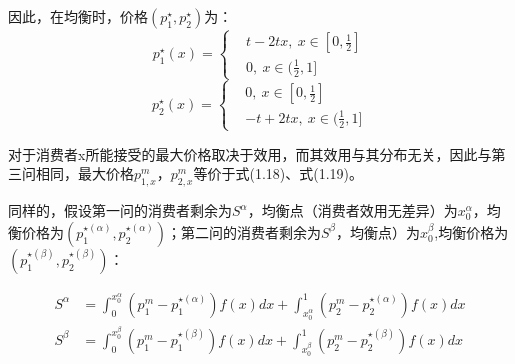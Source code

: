 因此，在均衡时，价格$(p_1^{\star},p_2^{\star})$为：
\begin{equation}
p_1^{\star}(x)=
    \begin{cases}
      &  t-2tx,  \ x \in [0,\frac{1}{2}] \\
     &0 ,\  x \in ( \frac{1}{2},1]
    \end{cases}
\end{equation}
\begin{equation}
p_2^{\star}(x)= 
    \begin{cases}
     & 0,  \ x \in [0,\frac{1}{2}] \\
     & -t+2tx ,\  x \in ( \frac{1}{2},1]
    \end{cases}
\end{equation}

\qsubpart
对于消费者x所能接受的最大价格取决于效用，而其效用与其分布无关，因此与第三问相同，最大价格$p^m_{1,x}$，$p^m_{2,x}$等价于式(1.18)、式(1.19)。

同样的，假设第一问的消费者剩余为$S^{\alpha}$，均衡点（消费者效用无差异）为$x_0^{\alpha}$，均衡价格为$(p_1^{\star(\alpha)},p_2^{\star(\alpha)})$；第二问的消费者剩余为$S^{\beta}$，均衡点）为$x_0^{\beta}$,均衡价格为$(p_1^{\star(\beta)},p_2^{\star(\beta)})$：

\begin{align}
    S^{\alpha} &= \int_0^{x_0^{\alpha}}(p_1^m-p_1^{\star(\alpha)})f(x)dx+\int_{x_0^{\alpha}}^{1}(p_2^m-p_2^{\star(\alpha)})f(x)dx \\
    S^{\beta} &= \int_0^{x_0^{\beta}}(p_1^m-p_1^{\star(\beta)})f(x)dx+\int_{x_0^{\beta}}^{1}(p_2^m-p_2^{\star(\beta)})f(x)dx 
\end{align}

